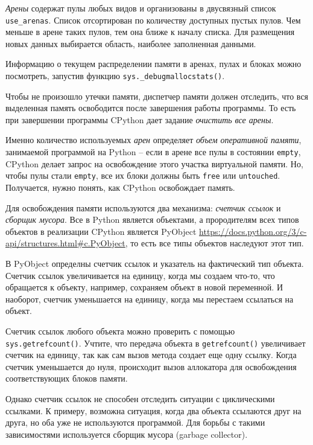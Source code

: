 \documentclass[%
	11pt,
	a4paper,
	utf8,
		]{article}
\begin{document}
\emph{Арены} содержат пулы любых видов и организованы в двусвязный список \texttt{use\_arenas}. Список отсортирован по количеству доступных пустых пулов. Чем меньше в арене таких пулов, тем она ближе к началу списка. Для размещения новых данных выбирается область, наиболее заполненная данными.

Информацию о текущем распределении памяти в аренах, пулах и блоках можно посмотреть, запустив функцию \texttt{sys.\_debugmallocstats()}.

Чтобы не произошло утечки памяти, диспетчер памяти должен отследить, что вся выделенная память освободится после завершения работы программы. То есть при завершении программы CPython дает задание \emph{очистить все арены}.

{\color{blue}
Именно количество используемых \emph{арен} определяет \emph{объем оперативной памяти}, занимаемой программой на Python -- если в арене все пулы в состоянии \texttt{empty}, CPython делает запрос на освобождение этого участка виртуальной памяти. Но, чтобы пулы стали \texttt{empty}, все их блоки должны быть \texttt{free} или \texttt{untouched}. Получается, нужно понять, как CPython освобождает память.
}

Для освобождения памяти используются два механизма: \emph{счетчик ссылок} и \emph{сборщик мусора}. Все в Python является объектами, а прородителям всех типов объектов в реализации CPython является PyObject \url{https://docs.python.org/3/c-api/structures.html#c.PyObject}, то есть все типы объектов наследуют этот тип.

В PyObject определны счетчик ссылок и указатель на фактический тип объекта. Счетчик ссылок увеличивается на единицу, когда мы создаем что-то, что обращается к объекту, например, сохраняем объект в новой переменной. И наоборот, счетчик уменьшается на единицу, когда мы перестаем ссылаться на объект.

Счетчик ссылок любого объекта можно проверить с помощью \texttt{sys.getrefcount()}. Учтите, что передача объекта в \texttt{getrefcount()} увеличивает счетчик на единицу, так как сам вызов метода создает еще одну ссылку. Когда счетчик уменьшается до нуля, происходит вызов аллокатора для освобождения соответствующих блоков памяти.

Однако счетчик ссылок не способен отследить ситуации с циклическими ссылками. К примеру, возможна ситуация, когда два объекта ссылаются друг на друга, но оба уже не используются программой. Для борьбы с такими зависимостями используется сборщик мусора (garbage collector).
\end{document}
